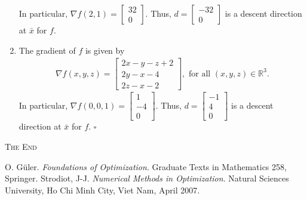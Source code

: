 \documentclass[a4paper]{article}
\numberwithin{equation}{section}
\begin{document}
\begin{enumerate}
In particular, $\nabla f\left( {2,1} \right) = \left[ {\begin{array}{*{20}{c}}
{32}\\
0
\end{array}} \right]$. Thus, $d = \left[ {\begin{array}{*{20}{c}}
{ - 32}\\
0
\end{array}} \right]$ is a descent direction at $\bar x$ for $f$.
\item The gradient of $f$ is given by
\begin{align}
\nabla f\left( {x,y,z} \right) = \left[ {\begin{array}{*{20}{c}}
{2x - y - z + 2}\\
{2y - x - 4}\\
{2z - x - 2}
\end{array}} \right],\mbox{ for all } \left( {x,y,z} \right) \in {\mathbb{R}^3}.
\end{align}
In particular, $\nabla f\left( {0,0,1} \right) = \left[ {\begin{array}{*{20}{c}}
1\\
{ - 4}\\
0
\end{array}} \right]$. Thus, $d = \left[ {\begin{array}{*{20}{c}}
{ - 1}\\
4\\
0
\end{array}} \right]$ is a descent direction at $\bar x$ for $f$. \hfill $\square$
\end{enumerate}
\vspace{1cm}
\begin{center}
\textsc{The End}
\end{center}
\newpage
\begin{thebibliography}{999}
 O. G\"{u}ler.  \textit{Foundations of Optimization}. Graduate Texts in Mathematics 258, Springer.
 Strodiot, J-J. \textit{Numerical Methods in Optimization}. Natural Sciences University, Ho Chi Minh City, Viet Nam, April 2007.
\end{thebibliography}
\end{document}
